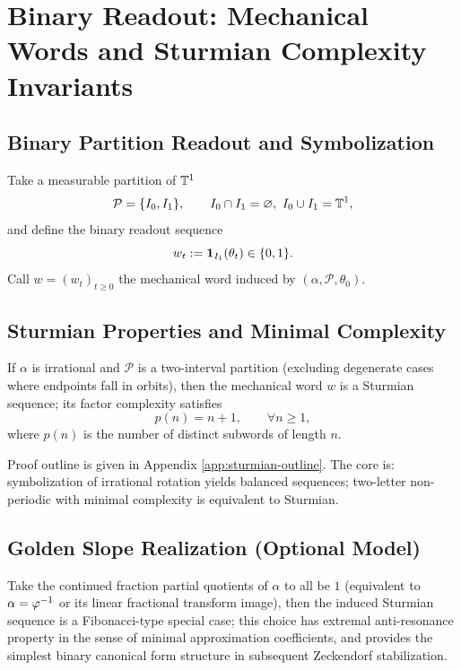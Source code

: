 \section{Binary Readout: Mechanical Words and Sturmian Complexity Invariants}

\subsection{Binary Partition Readout and Symbolization}

\begin{definition}\label{def:binary-partition-readout}
Take a measurable partition of $\mathbb{T}^1$
\[
\mathcal{P}=\{I_0,I_1\},\qquad I_0\cap I_1=\varnothing,\ I_0\cup I_1=\mathbb{T}^1,
\]
and define the binary readout sequence
\[
w_t:=\mathbf{1}_{I_1}(\theta_t)\in\{0,1\}.
\]
Call $w=(w_t)_{t\ge 0}$ the mechanical word induced by $(\alpha,\mathcal{P},\theta_0)$.
\end{definition}

\subsection{Sturmian Properties and Minimal Complexity}

\begin{theorem}\label{thm:sturmian-min-complexity}
If $\alpha$ is irrational and $\mathcal{P}$ is a two-interval partition (excluding degenerate cases where endpoints fall in orbits), then the mechanical word $w$ is a Sturmian sequence; its factor complexity satisfies
\[
p(n)=n+1,\qquad \forall n\ge 1,
\]
where $p(n)$ is the number of distinct subwords of length $n$.
\end{theorem}

\begin{remark}
Proof outline is given in Appendix \ref{app:sturmian-outline}. The core is: symbolization of irrational rotation yields balanced sequences; two-letter non-periodic with minimal complexity is equivalent to Sturmian.
\end{remark}

\subsection{Golden Slope Realization (Optional Model)}

\begin{assumption}\label{assump:golden-slope}
Take the continued fraction partial quotients of $\alpha$ to all be $1$ (equivalent to $\alpha=\varphi^{-1}$ or its linear fractional transform image), then the induced Sturmian sequence is a Fibonacci-type special case; this choice has extremal anti-resonance property in the sense of minimal approximation coefficients, and provides the simplest binary canonical form structure in subsequent Zeckendorf stabilization.
\end{assumption}
